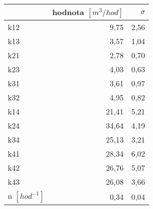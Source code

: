 \begin{tabular}{lrr}
\toprule
{} &  hodnota $\left[\si{m^3/hod}\right]$ &  $\sigma$ \\
\midrule
k12                 &                                 9,75 &      2,56 \\
k13                 &                                 3,57 &      1,04 \\
k21                 &                                 2,78 &      0,70 \\
k23                 &                                 4,03 &      0,63 \\
k31                 &                                 3,61 &      0,97 \\
k32                 &                                 4,95 &      0,82 \\
k14                 &                                21,41 &      5,21 \\
k24                 &                                34,64 &      4,19 \\
k34                 &                                25,13 &      3,21 \\
k41                 &                                28,34 &      6,02 \\
k42                 &                                26,76 &      5,07 \\
k43                 &                                26,08 &      3,66 \\
n $[\si{hod^{-1}}]$ &                                 0,34 &      0,04 \\
\bottomrule
\end{tabular}
